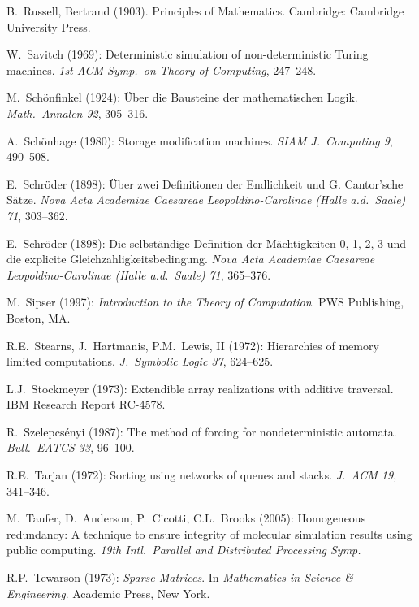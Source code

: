 \begin{thebibliography}{999}
B.~Russell, Bertrand (1903). Principles of Mathematics. Cambridge:
Cambridge University Press. 



W.~Savitch (1969): Deterministic simulation of non-deterministic
Turing machines.  {\it 1st ACM Symp.~on Theory of Computing},
247--248.

M.~Sch\"onfinkel (1924): \"{U}ber die Bausteine der mathematischen
Logik.  {\it Math.~Annalen 92}, 305--316.

A.~Sch\"{o}nhage (1980): Storage modification machines.  {\it SIAM
J.~Computing 9}, 490--508.

E.~Schr\"{o}der (1898): \"{U}ber zwei Definitionen der Endlichkeit und
G. Cantor'sche S\"{a}tze.  {\it Nova Acta Academiae Caesareae
Leopoldino-Carolinae (Halle a.d.~Saale) 71}, 303--362.

E.~Schr\"{o}der (1898): Die selbst\"{a}ndige Definition der
M\"{a}chtigkeiten 0, 1, 2, 3 und die explicite
Gleichzahligkeitsbedingung.  {\it Nova Acta Academiae Caesareae
Leopoldino-Carolinae (Halle a.d.~Saale) 71}, 365--376.

M.~Sipser (1997):
{\it Introduction to the Theory of Computation}.
PWS Publishing, Boston, MA.

R.E.~Stearns, J.~Hartmanis, P.M.~Lewis, II (1972): Hierarchies of
memory limited computations.  {\it J.~Symbolic Logic 37}, 624--625.

L.J.~Stockmeyer (1973): Extendible array realizations with additive
traversal.  IBM Research Report RC-4578.

R.~Szelepcs\'{e}nyi (1987): The method of forcing for nondeterministic
automata.  {\em Bull.~EATCS 33}, 96--100.


R.E.~Tarjan (1972): Sorting using networks of queues and stacks.  {\it
  J.~ACM 19}, 341--346.

M.~Taufer, D.~Anderson, P.~Cicotti, C.L.~Brooks (2005): Homogeneous
redundancy: A technique to ensure integrity of molecular simulation
results using public computing.  {\it 19th Intl.~Parallel and
Distributed Processing Symp.}

R.P.~Tewarson (1973):
{\it Sparse Matrices}.  In {\it Mathematics in Science \&
  Engineering}.
Academic Press, New York.


\end{thebibliography}
